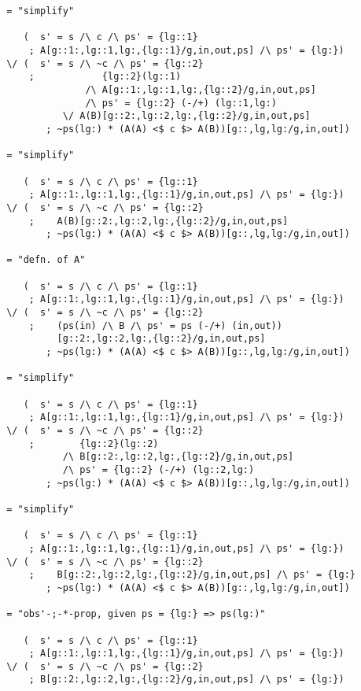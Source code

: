 \begin{verbatim}
 = "simplify"

    (  s' = s /\ c /\ ps' = {lg::1}
     ; A[g::1:,lg::1,lg:,{lg::1}/g,in,out,ps] /\ ps' = {lg:})
 \/ (  s' = s /\ ~c /\ ps' = {lg::2}
     ;            {lg::2}(lg::1)
               /\ A[g::1:,lg::1,lg:,{lg::2}/g,in,out,ps]
               /\ ps' = {lg::2} (-/+) (lg::1,lg:)
           \/ A(B)[g::2:,lg::2,lg:,{lg::2}/g,in,out,ps]
        ; ~ps(lg:) * (A(A) <$ c $> A(B))[g::,lg,lg:/g,in,out])

 = "simplify"

    (  s' = s /\ c /\ ps' = {lg::1}
     ; A[g::1:,lg::1,lg:,{lg::1}/g,in,out,ps] /\ ps' = {lg:})
 \/ (  s' = s /\ ~c /\ ps' = {lg::2}
     ;    A(B)[g::2:,lg::2,lg:,{lg::2}/g,in,out,ps]
        ; ~ps(lg:) * (A(A) <$ c $> A(B))[g::,lg,lg:/g,in,out])

 = "defn. of A"

    (  s' = s /\ c /\ ps' = {lg::1}
     ; A[g::1:,lg::1,lg:,{lg::1}/g,in,out,ps] /\ ps' = {lg:})
 \/ (  s' = s /\ ~c /\ ps' = {lg::2}
     ;    (ps(in) /\ B /\ ps' = ps (-/+) (in,out))
          [g::2:,lg::2,lg:,{lg::2}/g,in,out,ps]
        ; ~ps(lg:) * (A(A) <$ c $> A(B))[g::,lg,lg:/g,in,out])

 = "simplify"

    (  s' = s /\ c /\ ps' = {lg::1}
     ; A[g::1:,lg::1,lg:,{lg::1}/g,in,out,ps] /\ ps' = {lg:})
 \/ (  s' = s /\ ~c /\ ps' = {lg::2}
     ;        {lg::2}(lg::2)
           /\ B[g::2:,lg::2,lg:,{lg::2}/g,in,out,ps]
           /\ ps' = {lg::2} (-/+) (lg::2,lg:)
        ; ~ps(lg:) * (A(A) <$ c $> A(B))[g::,lg,lg:/g,in,out])

 = "simplify"

    (  s' = s /\ c /\ ps' = {lg::1}
     ; A[g::1:,lg::1,lg:,{lg::1}/g,in,out,ps] /\ ps' = {lg:})
 \/ (  s' = s /\ ~c /\ ps' = {lg::2}
     ;    B[g::2:,lg::2,lg:,{lg::2}/g,in,out,ps] /\ ps' = {lg:}
        ; ~ps(lg:) * (A(A) <$ c $> A(B))[g::,lg,lg:/g,in,out])

 = "obs'-;-*-prop, given ps = {lg:} => ps(lg:)"

    (  s' = s /\ c /\ ps' = {lg::1}
     ; A[g::1:,lg::1,lg:,{lg::1}/g,in,out,ps] /\ ps' = {lg:})
 \/ (  s' = s /\ ~c /\ ps' = {lg::2}
     ; B[g::2:,lg::2,lg:,{lg::2}/g,in,out,ps] /\ ps' = {lg:})
\end{verbatim}
